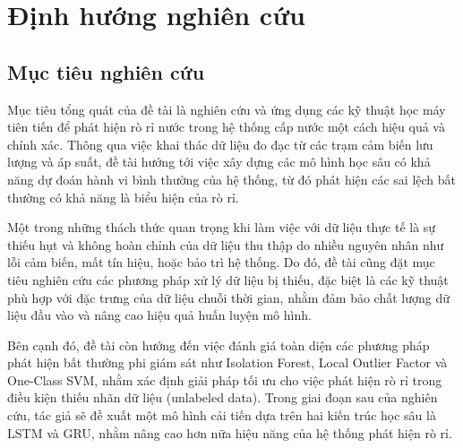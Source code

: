 \section{Định hướng nghiên cứu}

\subsection{Mục tiêu nghiên cứu}
Mục tiêu tổng quát của đề tài là nghiên cứu và ứng dụng các kỹ thuật học máy tiên tiến để phát hiện rò rỉ nước trong hệ thống cấp nước một cách hiệu quả và chính xác. Thông qua việc khai thác dữ liệu đo đạc từ các trạm cảm biến lưu lượng và áp suất, đề tài hướng tới việc xây dựng các mô hình học sâu có khả năng dự đoán hành vi bình thường của hệ thống, từ đó phát hiện các sai lệch bất thường có khả năng là biểu hiện của rò rỉ.

Một trong những thách thức quan trọng khi làm việc với dữ liệu thực tế là sự thiếu hụt và không hoàn chỉnh của dữ liệu thu thập do nhiều nguyên nhân như lỗi cảm biến, mất tín hiệu, hoặc bảo trì hệ thống. Do đó, đề tài cũng đặt mục tiêu nghiên cứu các phương pháp xử lý dữ liệu bị thiếu, đặc biệt là các kỹ thuật phù hợp với đặc trưng của dữ liệu chuỗi thời gian, nhằm đảm bảo chất lượng dữ liệu đầu vào và nâng cao hiệu quả huấn luyện mô hình.

Bên cạnh đó, đề tài còn hướng đến việc đánh giá toàn diện các phương pháp phát hiện bất thường phi giám sát như Isolation Forest, Local Outlier Factor và One-Class SVM, nhằm xác định giải pháp tối ưu cho việc phát hiện rò rỉ trong điều kiện thiếu nhãn dữ liệu (unlabeled data). Trong giai đoạn sau của nghiên cứu, tác giả sẽ đề xuất một mô hình cải tiến dựa trên hai kiến trúc học sâu là LSTM và GRU, nhằm nâng cao hơn nữa hiệu năng của hệ thống phát hiện rò rỉ.


